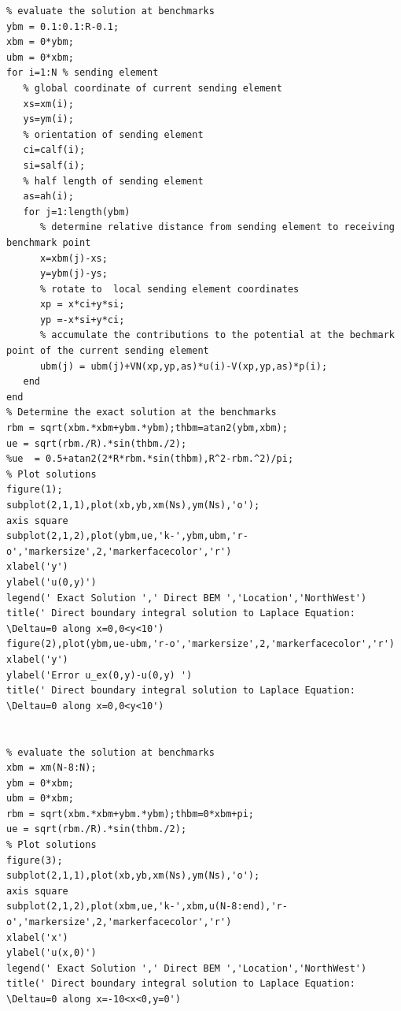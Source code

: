 \documentclass[letterpaper, reqno,11pt]{article}
\begin{document}
\begin{lstlisting}
% evaluate the solution at benchmarks
ybm = 0.1:0.1:R-0.1;
xbm = 0*ybm;
ubm = 0*xbm;
for i=1:N % sending element
   % global coordinate of current sending element
   xs=xm(i);   
   ys=ym(i);
   % orientation of sending element
   ci=calf(i);
   si=salf(i);
   % half length of sending element
   as=ah(i);
   for j=1:length(ybm)
      % determine relative distance from sending element to receiving benchmark point
      x=xbm(j)-xs;
      y=ybm(j)-ys;
      % rotate to  local sending element coordinates
      xp = x*ci+y*si;
      yp =-x*si+y*ci;
      % accumulate the contributions to the potential at the bechmark point of the current sending element
      ubm(j) = ubm(j)+VN(xp,yp,as)*u(i)-V(xp,yp,as)*p(i);
   end
end
% Determine the exact solution at the benchmarks
rbm = sqrt(xbm.*xbm+ybm.*ybm);thbm=atan2(ybm,xbm);
ue = sqrt(rbm./R).*sin(thbm./2);
%ue  = 0.5+atan2(2*R*rbm.*sin(thbm),R^2-rbm.^2)/pi;
% Plot solutions 
figure(1);
subplot(2,1,1),plot(xb,yb,xm(Ns),ym(Ns),'o');
axis square
subplot(2,1,2),plot(ybm,ue,'k-',ybm,ubm,'r-o','markersize',2,'markerfacecolor','r')
xlabel('y')
ylabel('u(0,y)')
legend(' Exact Solution ',' Direct BEM ','Location','NorthWest')
title(' Direct boundary integral solution to Laplace Equation: \Deltau=0 along x=0,0<y<10')
figure(2),plot(ybm,ue-ubm,'r-o','markersize',2,'markerfacecolor','r')
xlabel('y')
ylabel('Error u_ex(0,y)-u(0,y) ')
title(' Direct boundary integral solution to Laplace Equation: \Deltau=0 along x=0,0<y<10')


% evaluate the solution at benchmarks
xbm = xm(N-8:N);
ybm = 0*xbm;
ubm = 0*xbm;
rbm = sqrt(xbm.*xbm+ybm.*ybm);thbm=0*xbm+pi;
ue = sqrt(rbm./R).*sin(thbm./2);
% Plot solutions 
figure(3);
subplot(2,1,1),plot(xb,yb,xm(Ns),ym(Ns),'o');
axis square
subplot(2,1,2),plot(xbm,ue,'k-',xbm,u(N-8:end),'r-o','markersize',2,'markerfacecolor','r')
xlabel('x')
ylabel('u(x,0)')
legend(' Exact Solution ',' Direct BEM ','Location','NorthWest')
title(' Direct boundary integral solution to Laplace Equation: \Deltau=0 along x=-10<x<0,y=0')

\end{lstlisting}
\end{document}
